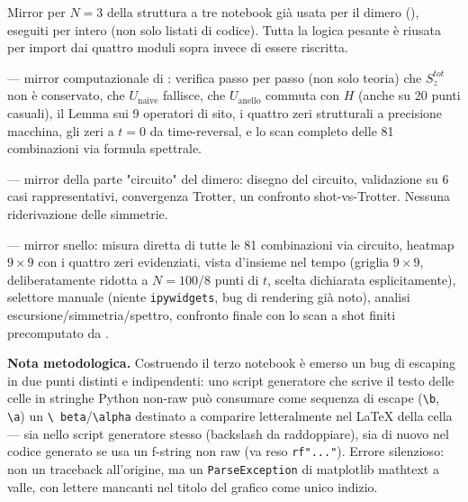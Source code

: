 \documentclass[11pt,a4paper]{article}
\begin{document}
Mirror per $N=3$ della struttura a tre notebook già usata per il dimero
(\texttt{}), eseguiti per intero (non
solo listati di codice). Tutta la logica pesante è riusata per import dai quattro
moduli sopra invece di essere riscritta.

\textbf{\texttt{}} — mirror
computazionale di
\texttt{}: verifica passo per
passo (non solo teoria) che $S_z^{tot}$ non è conservato, che $U_\text{naive}$
fallisce, che $U_\text{anello}$ commuta con $H$ (anche su 20 punti casuali), il
Lemma sui 9 operatori di sito, i quattro zeri strutturali a precisione macchina, gli
zeri a $t=0$ da time-reversal, e lo scan completo delle 81 combinazioni via formula
spettrale.

\textbf{\texttt{}} —
mirror della parte "circuito" del dimero: disegno del circuito, validazione su 6
casi rappresentativi, convergenza Trotter, un confronto shot-vs-Trotter. Nessuna
riderivazione delle simmetrie.

\textbf{\texttt{}} —
mirror snello: misura diretta di tutte le 81 combinazioni via circuito, heatmap
$9\times9$ con i quattro zeri evidenziati, vista d'insieme nel tempo (griglia
$9\times9$, deliberatamente ridotta a $N=100$/8 punti di $t$, scelta dichiarata
esplicitamente), selettore manuale (niente \texttt{ipywidgets}, bug di rendering
già noto), analisi escursione/simmetria/spettro, confronto finale con lo scan a
shot finiti precomputato da \texttt{}.

\textbf{Nota metodologica.} Costruendo il terzo notebook è emerso un bug di
escaping in due punti distinti e indipendenti: uno script generatore che scrive il
testo delle celle in stringhe Python non-raw può consumare come sequenza di escape
(\texttt{\textbackslash b}, \texttt{\textbackslash a}) un \texttt{\textbackslash
beta}/\texttt{\textbackslash alpha} destinato a comparire letteralmente nel LaTeX
della cella — sia nello script generatore stesso (backslash da raddoppiare), sia
di nuovo nel codice generato se usa un f-string non raw (va reso \texttt{rf"..."}).
Errore silenzioso: non un traceback all'origine, ma un \texttt{ParseException} di
matplotlib mathtext a valle, con lettere mancanti nel titolo del grafico come unico
indizio.
\end{document}
